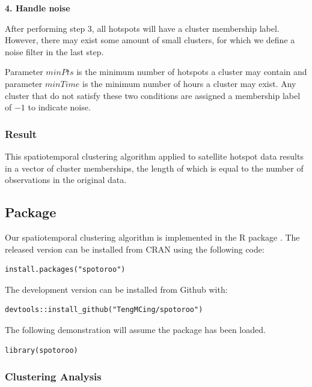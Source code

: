 \textbf{4. Handle noise}

After performing step 3, all hotspots will have a cluster membership
label. However, there may exist some amount of small clusters, for which
we define a noise filter in the last step.

Parameter \(minPts\) is the minimum number of hotspots a cluster may
contain and parameter \(minTime\) is the minimum number of hours a
cluster may exist. Any cluster that do not satisfy these two conditions
are assigned a membership label of \(-1\) to indicate noise.

\hypertarget{result}{%
\subsubsection{Result}\label{result}}

This spatiotemporal clustering algorithm applied to satellite hotspot
data results in a vector of cluster memberships, the length of which is
equal to the number of observations in the original data.

\hypertarget{package}{%
\subsection{Package}\label{package}}

Our spatiotemporal clustering algorithm is implemented in the R package
. The released version can be installed from CRAN
using the following code:

\begin{verbatim}
install.packages("spotoroo")
\end{verbatim}

The development version can be installed from Github with:

\begin{verbatim}
devtools::install_github("TengMCing/spotoroo")
\end{verbatim}

The following demonstration will assume the package 
has been loaded.

\begin{verbatim}
library(spotoroo)
\end{verbatim}

\hypertarget{clustering-analysis}{%
\subsubsection{Clustering Analysis}\label{clustering-analysis}}

